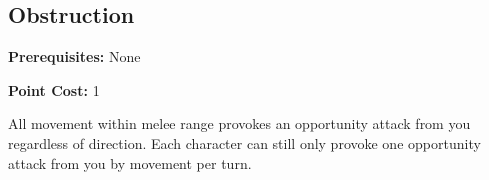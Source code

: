 \subsection*{Obstruction}\label{feat:obstruction}

\noindent
\textbf{Prerequisites:} None

\noindent
\textbf{Point Cost:} 1 

All movement within melee range provokes an opportunity attack from you
regardless of direction. Each character can still only provoke one opportunity
attack from you by movement per turn.

